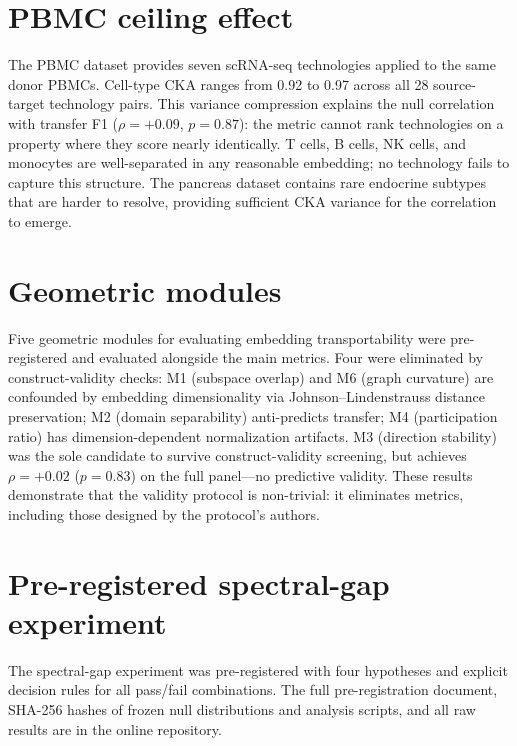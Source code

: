 \documentclass[11pt]{article}
\begin{document}
\appendix

\section{PBMC ceiling effect}
\label{app:pbmc}

The PBMC dataset \citep{ding2020systematic} provides seven scRNA-seq
technologies applied to the same donor PBMCs. Cell-type CKA ranges from
0.92 to 0.97 across all 28 source-target technology pairs. This
variance compression explains the null correlation with transfer F1
($\rho = +0.09$, $p = 0.87$): the metric cannot rank technologies on
a property where they score nearly identically. T cells, B cells, NK
cells, and monocytes are well-separated in any reasonable embedding; no
technology fails to capture this structure. The pancreas dataset contains
rare endocrine subtypes that are harder to resolve, providing sufficient
CKA variance for the correlation to emerge.


\section{Geometric modules}
\label{app:modules}

Five geometric modules for evaluating embedding transportability were
pre-registered and evaluated alongside the main metrics. Four were
eliminated by construct-validity checks: M1 (subspace overlap) and M6
(graph curvature) are confounded by embedding dimensionality via
Johnson--Lindenstrauss distance preservation; M2 (domain separability)
anti-predicts transfer; M4 (participation ratio) has
dimension-dependent normalization artifacts. M3 (direction stability)
was the sole candidate to survive construct-validity screening, but
achieves $\rho = +0.02$ ($p = 0.83$) on the full panel---no
predictive validity. These results demonstrate that the validity
protocol is non-trivial: it eliminates metrics, including those designed
by the protocol's authors.


\section{Pre-registered spectral-gap experiment}
\label{app:spectral}

The spectral-gap experiment was pre-registered with four hypotheses and
explicit decision rules for all pass/fail combinations. The full
pre-registration document, SHA-256 hashes of frozen null distributions
and analysis scripts, and all raw results are in the online repository.
\end{document}
